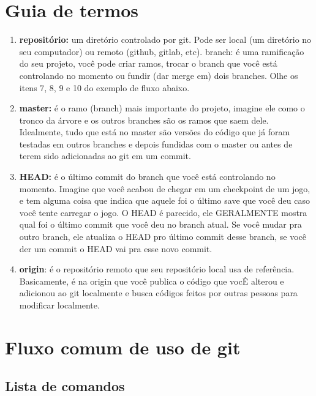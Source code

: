 \documentclass[12pt]{article}
\begin{document}
\tableofcontents

\newpage
\begin{doublespacing}

\section{Guia de termos}
\begin{enumerate}
	\item{\textbf{ repositório:} um diretório controlado por git. Pode ser local (um diretório no seu computador) ou remoto (github, gitlab, etc).}
branch: é uma ramificação do seu projeto, você pode criar ramos, trocar o branch que você está controlando no momento ou fundir (dar merge em) dois branches. Olhe os itens 7, 8, 9 e 10 do exemplo de fluxo abaixo.
\item{\textbf{master:} é o ramo (branch) mais importante do projeto, imagine ele como o tronco da árvore e os outros branches são os ramos que saem dele. Idealmente, tudo que está no master são versões do código que já foram testadas em outros branches e depois fundidas com o master ou antes de terem sido adicionadas ao git em um commit.}
	\item{\textbf{HEAD:} é o último commit do branch que você está controlando no momento. Imagine que você acabou de chegar em um checkpoint de um jogo, e tem alguma coisa que indica que aquele foi o último save que você deu caso você tente carregar o jogo. O HEAD é parecido, ele GERALMENTE mostra qual foi o último commit que você deu no branch atual. Se você mudar pra outro branch, ele atualiza o HEAD pro último commit desse branch, se você der um commit o HEAD vai pra esse novo commit.}
\item{\textbf{origin}: é o repositório remoto que seu repositório local usa de referência. Basicamente, é na origin que você publica o código que vocÊ alterou e adicionou ao git localmente e busca códigos feitos por outras pessoas para modificar localmente.}

\end{enumerate}

\section{Fluxo comum de uso de git}
\subsection{Lista de comandos}
\label{comandos}
\begin{enumerate}


\end{enumerate}
\end{doublespacing}
\end{document}
